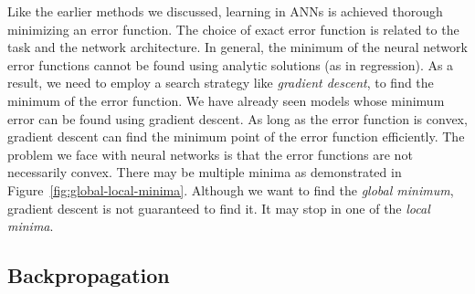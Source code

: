 Like the earlier methods we discussed,
learning in ANNs is achieved thorough minimizing an error function.
The choice of exact error function is related to the task
and the network architecture.
In general,
the minimum of the neural network error functions cannot be found
using analytic solutions (as in regression).
As a result,
we need to employ a search strategy like \emph{gradient descent},
to find the minimum of the error function.
We have already seen models whose minimum error can be found
using gradient descent.
As long as the error function is convex,
gradient descent can find the minimum point of the error function efficiently.
The problem we face with neural networks is that
the error functions are not necessarily convex.
There may be multiple minima
as demonstrated in Figure~\ref{fig:global-local-minima}.
Although we want to find the \emph{global minimum},
gradient descent is not guaranteed to find it.
It may stop in one of the \emph{local minima}.
\begin{marginfigure}
  \caption{\label{fig:global-local-minima}%
    A demonstration of multiple minima with two parameters.
  }
\end{marginfigure}

\subsection{Backpropagation}

